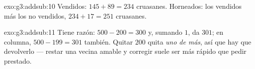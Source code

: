 \begin{solution}{exo:g3:addsub:10}
Vendidos: $145 + 89 = 234$ cruasanes. Horneados: los vendidos más los no vendidos,
$234 + 17 = 251$ cruasanes.
\end{solution}

\begin{solution}{exo:g3:addsub:11}
Tiene razón: $500 - 200 = 300$ y, sumando $1$, da $301$; en columna,
$500 - 199 = 301$ también. Quitar $200$ quita \emph{uno de más},
así que hay que devolverlo --- restar una vecina amable y
corregir suele ser más rápido que pedir prestado.
\end{solution}
